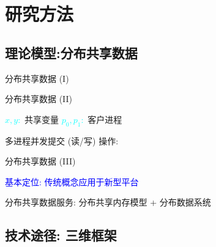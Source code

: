 \section{研究方法}

\subsection{理论模型:分布共享数据}

\begin{frame}{分布共享数据 (I)}
\end{frame}
\begin{frame}{分布共享数据 (II)}
  \begin{center}
    \textcolor{cyan}{$x, y:$} 共享变量 \hspace{0.30cm} \textcolor{cyan}{$p_0, p_1:$} 
    客户进程
  \end{center}

  多进程并发提交 (读/写) 操作:
  

  \begin{center}
  \end{center}

\end{frame}
\begin{frame}{分布共享数据 (III)}
  \begin{center}
    \textcolor{blue}{\large 基本定位: 传统概念应用于新型平台}
  \end{center}

  \vspace{0.20cm}
  \begin{center}
    分布共享数据服务: 分布共享内存模型 + 分布数据系统
  \end{center}
\end{frame}
\subsection{技术途径: 三维框架}


